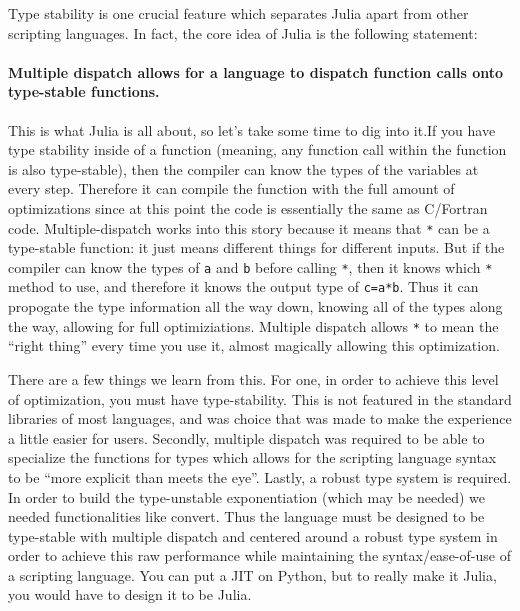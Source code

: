 \documentclass[11pt]{article}
\begin{document}
Type stability is one crucial feature which separates Julia apart from
other scripting languages. In fact, the core idea of Julia is the
following statement:

\hypertarget{multiple-dispatch-allows-for-a-language-to-dispatch-function-calls-onto-type-stable-functions.}{%
\paragraph{Multiple dispatch allows for a language to dispatch function
calls onto type-stable
functions.}\label{multiple-dispatch-allows-for-a-language-to-dispatch-function-calls-onto-type-stable-functions.}}

This is what Julia is all about, so let's take some time to dig into
it.If you have type stability inside of a function (meaning, any
function call within the function is also type-stable), then the
compiler can know the types of the variables at every step. Therefore it
can compile the function with the full amount of optimizations since at
this point the code is essentially the same as C/Fortran code.
Multiple-dispatch works into this story because it means that \texttt{*}
can be a type-stable function: it just means different things for
different inputs. But if the compiler can know the types of \texttt{a}
and \texttt{b} before calling \texttt{*}, then it knows which \texttt{*}
method to use, and therefore it knows the output type of \texttt{c=a*b}.
Thus it can propogate the type information all the way down, knowing all
of the types along the way, allowing for full optimiziations. Multiple
dispatch allows \texttt{*} to mean the ``right thing'' every time you
use it, almost magically allowing this optimization.

There are a few things we learn from this. For one, in order to achieve
this level of optimization, you must have type-stability. This is not
featured in the standard libraries of most languages, and was choice
that was made to make the experience a little easier for users.
Secondly, multiple dispatch was required to be able to specialize the
functions for types which allows for the scripting language syntax to be
``more explicit than meets the eye''. Lastly, a robust type system is
required. In order to build the type-unstable exponentiation (which may
be needed) we needed functionalities like convert. Thus the language
must be designed to be type-stable with multiple dispatch and centered
around a robust type system in order to achieve this raw performance
while maintaining the syntax/ease-of-use of a scripting language. You
can put a JIT on Python, but to really make it Julia, you would have to
design it to be Julia.
\end{document}
